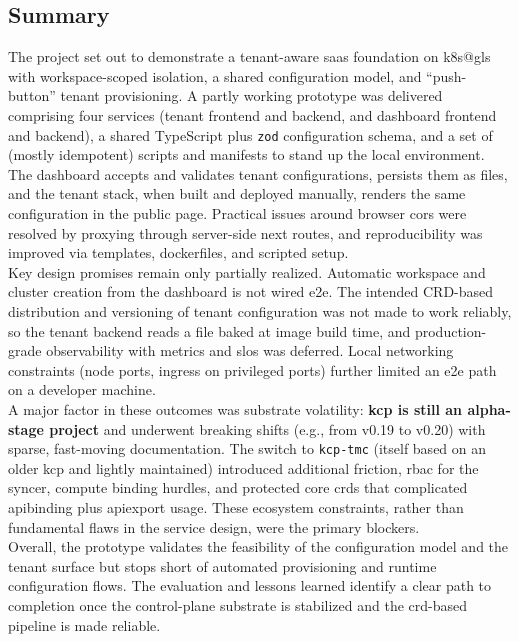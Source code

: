 \documentclass[11pt, a4paper, oneside, listof=totoc]{scrartcl}
\begin{document}
        \subsection{Summary}\label{subsec:summary}
        The project set out to demonstrate a tenant-aware \gls{saas} foundation on \gls{k8s@gls}
        with workspace-scoped isolation, a shared configuration model, and \enquote{push-button}
        tenant provisioning.
        A partly working prototype was delivered comprising four services (tenant frontend and
        backend, and dashboard frontend and backend), a shared TypeScript plus \texttt{zod}
        configuration schema, and a set of (mostly idempotent) scripts and manifests to stand up the
        local environment.
        The dashboard accepts and validates tenant configurations, persists them as files, and the
        tenant stack, when built and deployed manually, renders the same configuration in the public
        page.
        Practical issues around browser \gls{cors} were resolved by proxying through server-side
        \gls{next} routes, and reproducibility was improved via templates, dockerfiles, and scripted
        setup.\\
        Key design promises remain only partially realized.
        Automatic workspace and cluster creation from the dashboard is not wired \gls{e2e}.
        The intended CRD-based distribution and versioning of tenant configuration was not made to
        work reliably, so the tenant backend reads a file baked at image build time,
        and production-grade observability with metrics and \glspl{slo} was deferred.
        Local networking constraints (node ports, \gls{ingress} on privileged ports) further limited an
        \gls{e2e} path on a developer machine.\\
        A major factor in these outcomes was substrate volatility:
        \textbf{\gls{kcp} is still an alpha-stage project} and underwent breaking shifts
        (e.g., from v0.19 to v0.20) with sparse, fast-moving documentation.
        The switch to \texttt{\gls{kcp}-\gls{tmc}} (itself based on an older \gls{kcp} and lightly
        maintained) introduced additional friction, \gls{rbac} for the syncer, compute binding
        hurdles, and protected core \glspl{crd} that complicated \gls{apibinding} plus \gls{apiexport} usage.
        These ecosystem constraints, rather than fundamental flaws in the service design, were the
        primary blockers.\\
        Overall, the prototype validates the feasibility of the configuration model and the tenant
        surface but stops short of automated provisioning and runtime configuration flows.
        The evaluation and lessons learned identify a clear path to completion once the
        control-plane substrate is stabilized and the \gls{crd}-based pipeline is made reliable.
\end{document}
